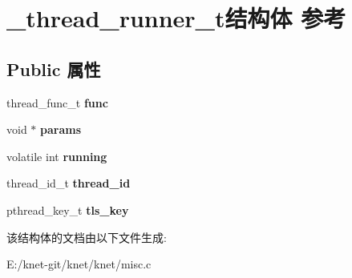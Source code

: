 \hypertarget{struct__thread__runner__t}{}\section{\+\_\+thread\+\_\+runner\+\_\+t结构体 参考}
\label{struct__thread__runner__t}
\subsection*{Public 属性}
\begin{DoxyCompactItemize}
\item 
\hypertarget{struct__thread__runner__t_a5e254750aa5522725788d808314b6620}{}thread\+\_\+func\+\_\+t {\bfseries func}\label{struct__thread__runner__t_a5e254750aa5522725788d808314b6620}

\item 
\hypertarget{struct__thread__runner__t_aab08f4e0fa5f6ffe16fcd3c055666c9c}{}void $\ast$ {\bfseries params}\label{struct__thread__runner__t_aab08f4e0fa5f6ffe16fcd3c055666c9c}

\item 
\hypertarget{struct__thread__runner__t_a158d37a73657b2df73e3a2dd383808f8}{}volatile int {\bfseries running}\label{struct__thread__runner__t_a158d37a73657b2df73e3a2dd383808f8}

\item 
\hypertarget{struct__thread__runner__t_ab632944b59861e33a9473347b0afdc00}{}thread\+\_\+id\+\_\+t {\bfseries thread\+\_\+id}\label{struct__thread__runner__t_ab632944b59861e33a9473347b0afdc00}

\item 
\hypertarget{struct__thread__runner__t_ad7461a4eef9b83e07f0acd4f26923744}{}pthread\+\_\+key\+\_\+t {\bfseries tls\+\_\+key}\label{struct__thread__runner__t_ad7461a4eef9b83e07f0acd4f26923744}

\end{DoxyCompactItemize}


该结构体的文档由以下文件生成\+:\begin{DoxyCompactItemize}
\item 
E\+:/knet-\/git/knet/knet/misc.\+c\end{DoxyCompactItemize}
